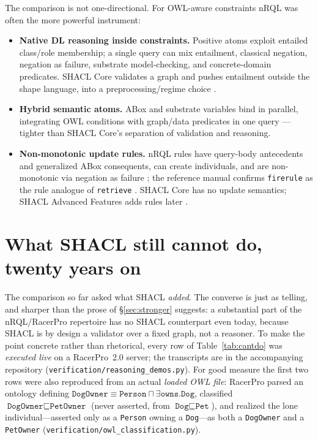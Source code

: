\documentclass[11pt,letterpaper]{article}
\theoremstyle{definition}
\newcommand{\nrql}{nRQL}
\newcommand{\racer}{RacerPro}
\newcommand{\shacl}{SHACL}
\newcommand{\naf}{negation as failure}
\newcommand{\abox}{ABox}
\newcommand{\owl}{OWL}
\begin{document}
The comparison is not one-directional. For \owl{}-aware constraints \nrql{} was often the more powerful instrument:
\begin{itemize}[leftmargin=2em]
  \item \textbf{Native DL reasoning inside constraints.} Positive atoms exploit entailed class/role membership; a single query can mix entailment, classical negation, \naf{}, substrate model-checking, and concrete-domain predicates. \shacl{} Core validates a graph and pushes entailment outside the shape language, into a preprocessing/regime choice \cite{shacl}.
  \item \textbf{Hybrid semantic atoms.} \abox{} and substrate variables bind in parallel, integrating \owl{} conditions with graph/data predicates in one query \cite[pp.~135--137]{racerug}---tighter than \shacl{} Core's separation of validation and reasoning.
  \item \textbf{Non-monotonic update rules.} \nrql{} rules have query-body antecedents and generalized \abox{} consequents, can create individuals, and are non-monotonic via \naf{} \cite[pp.~125--127]{racerug}; the reference manual confirms \texttt{firerule} as the rule analogue of \texttt{retrieve} \cite[pp.~160--161]{racerrm}. \shacl{} Core has no update semantics; \shacl{} Advanced Features adds rules later \cite{shaclaf}.
\end{itemize}

\section{What \shacl{} still cannot do, twenty years on}\label{sec:cantdo}
The comparison so far asked what \shacl{} \emph{added}. The converse is just as telling, and sharper than the prose of \S\ref{sec:stronger} suggests: a substantial part of the \nrql{}/\racer{} repertoire has no \shacl{} counterpart even today, because \shacl{} is by design a validator over a fixed graph, not a reasoner. To make the point concrete rather than rhetorical, every row of Table~\ref{tab:cantdo} was \emph{executed live} on a \racer{}~2.0 server; the transcripts are in the accompanying repository (\texttt{verification/reasoning\_demos.py}). For good measure the first two rows were also reproduced from an actual \emph{loaded \owl{} file}: \racer{} parsed an ontology defining $\texttt{DogOwner}\equiv\texttt{Person}\sqcap\exists\texttt{owns.Dog}$, classified $\texttt{DogOwner}\sqsubseteq\texttt{PetOwner}$ (never asserted, from $\texttt{Dog}\sqsubseteq\texttt{Pet}$), and realized the lone individual---asserted only as a \texttt{Person} owning a \texttt{Dog}---as both a \texttt{DogOwner} and a \texttt{PetOwner} (\texttt{verification/owl\_classification.py}).
\end{document}
